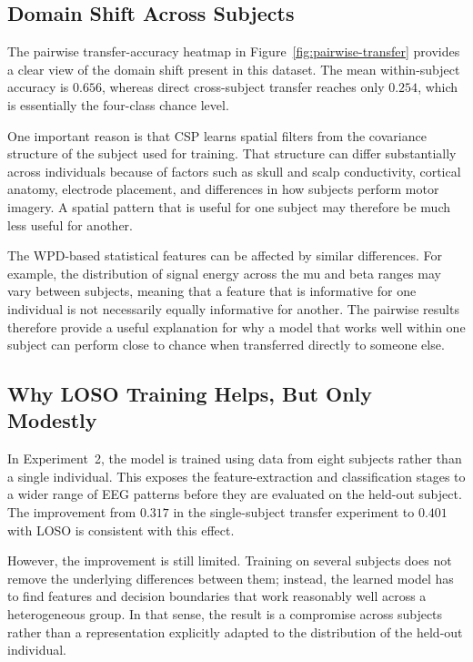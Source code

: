 \documentclass[11pt,a4paper]{article}
\begin{document}
\subsection{Domain Shift Across Subjects}

The pairwise transfer-accuracy heatmap in Figure~\ref{fig:pairwise-transfer} provides a clear
view of the domain shift present in this dataset. The mean within-subject accuracy is $0.656$,
whereas direct cross-subject transfer reaches only $0.254$, which is essentially the four-class
chance level.

One important reason is that CSP learns spatial filters from the covariance structure of the
subject used for training. That structure can differ substantially across individuals because
of factors such as skull and scalp conductivity, cortical anatomy, electrode placement, and
differences in how subjects perform motor imagery. A spatial pattern that is useful for one
subject may therefore be much less useful for another.

The WPD-based statistical features can be affected by similar differences. For example, the
distribution of signal energy across the mu and beta ranges may vary between subjects, meaning
that a feature that is informative for one individual is not necessarily equally informative
for another. The pairwise results therefore provide a useful explanation for why a model that
works well within one subject can perform close to chance when transferred directly to someone
else.

\subsection{Why LOSO Training Helps, But Only Modestly}

In Experiment~2, the model is trained using data from eight subjects rather than a single
individual. This exposes the feature-extraction and classification stages to a wider range of
EEG patterns before they are evaluated on the held-out subject. The improvement from
$0.317$ in the single-subject transfer experiment to $0.401$ with LOSO is consistent with this
effect.

However, the improvement is still limited. Training on several subjects does not remove the
underlying differences between them; instead, the learned model has to find features and
decision boundaries that work reasonably well across a heterogeneous group. In that sense, the
result is a compromise across subjects rather than a representation explicitly adapted to the
distribution of the held-out individual.
\end{document}
